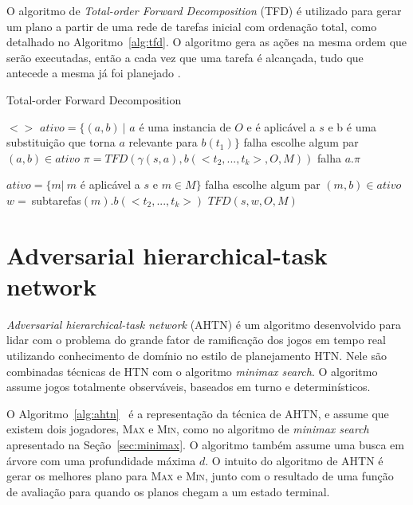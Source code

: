 O algoritmo de \textit{Total-order Forward Decomposition} (TFD) é utilizado para gerar um plano a partir de uma rede de tarefas inicial com ordenação total, como detalhado no Algoritmo~\ref{alg:tfd}.
O algoritmo gera as ações na mesma ordem que serão executadas, então a cada vez que uma tarefa é alcançada, tudo que antecede a mesma já foi planejado \cite{ghallab2004automated}.
 
\begin{algorithm}
	\caption{Total-order Forward Decomposition}
	\label{alg:tfd}
	\begin{algorithmic}[1]		
				\State	\Return $<>$
			\EndIf
				\State $ativo = \{(a, b)~ |$ $a$ é uma instancia de $O$ e é aplicável a $s$ e b é uma substituição que torna $a$ relevante para $b(t_{1})\}$
					\State \Return falha
				\EndIf
				\State escolhe algum par $(a, b) \in ativo$
				\State $\pi = TFD(\gamma(s, a), b(<t_{2}, ..., t_{k}>, O, M))$
					\State \Return falha
				\Else 
					\State \Return $a . \pi$
			\EndIf
			
			\Else
				\State $ativo = \{m |~ m$ é aplicável a $s$ e $m \in M\}$
					\State \Return falha
				\EndIf
				\State escolhe algum par $(m, b) \in ativo$
				\State $w =~ $subtarefas$(m).b(<t_{2}, ..., t_{k}>)$
				\State \Return $TFD(s, w, O, M)$
				\EndIf
		\EndFunction
	\end{algorithmic}
\end{algorithm}

\section{Adversarial hierarchical-task network} \label{sec:ahtn}

\textit{Adversarial hierarchical-task network} (AHTN) é um algoritmo desenvolvido para lidar com o problema do grande fator de ramificação dos jogos em tempo real~\cite{ontanon2015adversarial} utilizando conhecimento de domínio no estilo de planejamento HTN. 
Nele são combinadas técnicas de HTN com o algoritmo \textit{minimax search}. 
O algoritmo assume jogos totalmente observáveis, baseados em turno e determinísticos. 

O Algoritmo~\ref{alg:ahtn}~\cite{ontanon2015adversarial} é a representação da técnica de AHTN, e assume que existem dois jogadores, \textsc{Max} e \textsc{Min}, como no algoritmo de \textit{minimax search} apresentado na Seção~\ref{sec:minimax}. 
O algoritmo também assume uma busca em árvore com uma profundidade máxima $d$. 
O intuito do algoritmo de AHTN é gerar os melhores plano para \textsc{Max} e \textsc{Min}, junto com o resultado de uma função de avaliação para quando os planos chegam a um estado terminal. 

